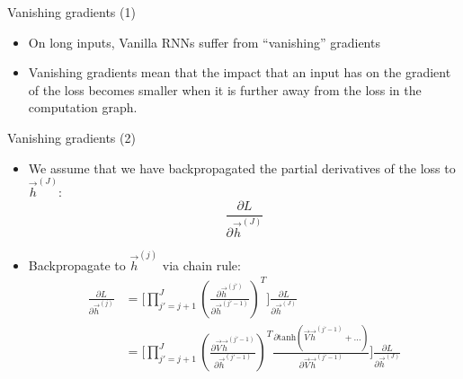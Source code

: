 
\begin{vbframe}{Vanishing gradients (1)}

\vfill

\begin{itemize}
	\item On long inputs, Vanilla RNNs suffer from ``vanishing'' gradients
	\item Vanishing gradients mean that the impact that an input has on the gradient of the loss becomes smaller when it is further away from the loss in the computation graph.
\end{itemize}

\vfill

\end{vbframe}


\begin{vbframe}{Vanishing gradients (2)}

\vfill

\begin{itemize}
\item We assume that we have backpropagated the partial derivatives of the loss to $\vec h^{(J)}$:
$$ \frac{\partial L}{\partial \vec h^{(J)}}$$
\item Backpropagate to $\vec h^{(j)}$ via chain rule:
$$
\begin{aligned}
\frac{\partial L}{\partial \vec h^{(j)}} & = \big[\prod_{j'=j+1}^{J} (\frac{\partial \vec h^{(j')}}{\partial \vec h^{(j'-1)}})^T\big] \frac{\partial L}{\partial \vec h^{(J)}} \\
& = \big[\prod_{j'=j+1}^{J} (\frac{\partial \vec V \vec h^{(j'-1)}}{\partial \vec h^{(j'-1)}})^T \frac{\partial \mathrm{tanh}(\vec V \vec h^{(j'-1)} + \ldots)}{\partial \vec V \vec h^{(j'-1)}} \big] \frac{\partial L}{\partial \vec h^{(J)}}
\end{aligned}
$$
\end{itemize}

\vfill

\end{vbframe}



